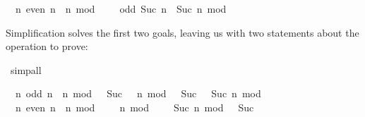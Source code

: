 \begin{isabellebody}
\begin{isamarkuptxt}
\begin{isabelle}
\ {}{}\ {}n{}\ even\ n\ {}\ {}n\ mod\ {}\ {}\ {}{}\ {}\ odd\ {}Suc\ n{}\ {}\ {}Suc\ n\ mod\ {}\ {}\ {}{}%
\end{isabelle}
  Simplification solves the first two goals, leaving us with two
  statements about the  operation to prove:%
\end{isamarkuptxt}%
\isamarkuptrue%
\isamarkupfalse%
\ simp{}all%
\begin{isamarkuptxt}%
\begin{isabelle}%
\ {}{}\ {}n{}\ odd\ n\ {}\ {}n\ mod\ {}\ {}\ Suc\ {}{}\ {}\ {}n\ mod\ {}\ {}\ Suc\ {}{}\ {}\ {}Suc\ n\ mod\ {}\ {}\ {}{}\isanewline
\ {}{}\ {}n{}\ even\ n\ {}\ {}n\ mod\ {}\ {}\ {}{}\ {}\ {}n\ mod\ {}\ {}\ {}{}\ {}\ {}Suc\ n\ mod\ {}\ {}\ Suc\ {}{}%
\end{isabelle} 


\end{isamarkuptxt}
\end{isabellebody}
